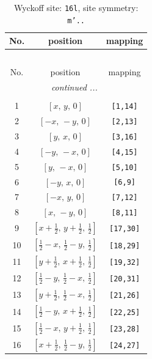 \documentclass[fleqn,8pt]{jsarticle}
\begin{document}
\renewcommand{\arraystretch}{1.2}
\begin{longtable}{ccc}
\caption{Wyckoff site: {\tt 16l}, site symmetry: {\tt m'..}}
 \\
 \hline \hline
No. & position & mapping \\ \hline \endfirsthead

\multicolumn{2}{l}{\tablename\ \thetable{}} \\
 \hline \hline
No. & position & mapping \\ \hline \endhead

 \hline \hline
\multicolumn{2}{r}{\footnotesize\it continued ...} \\ \endfoot

 \hline \hline
\multicolumn{2}{r}{} \\ \endlastfoot

1 & $\left[ x,\, y,\, 0 \right]$ & {\tt [1,14]} \\ \hline
2 & $\left[ - x,\, - y,\, 0 \right]$ & {\tt [2,13]} \\ \hline
3 & $\left[ y,\, x,\, 0 \right]$ & {\tt [3,16]} \\ \hline
4 & $\left[ - y,\, - x,\, 0 \right]$ & {\tt [4,15]} \\ \hline
5 & $\left[ y,\, - x,\, 0 \right]$ & {\tt [5,10]} \\ \hline
6 & $\left[ - y,\, x,\, 0 \right]$ & {\tt [6,9]} \\ \hline
7 & $\left[ - x,\, y,\, 0 \right]$ & {\tt [7,12]} \\ \hline
8 & $\left[ x,\, - y,\, 0 \right]$ & {\tt [8,11]} \\ \hline
9 & $\left[ x + \frac{1}{2},\, y + \frac{1}{2},\, \frac{1}{2} \right]$ & {\tt [17,30]} \\ \hline
10 & $\left[ \frac{1}{2} - x,\, \frac{1}{2} - y,\, \frac{1}{2} \right]$ & {\tt [18,29]} \\ \hline
11 & $\left[ y + \frac{1}{2},\, x + \frac{1}{2},\, \frac{1}{2} \right]$ & {\tt [19,32]} \\ \hline
12 & $\left[ \frac{1}{2} - y,\, \frac{1}{2} - x,\, \frac{1}{2} \right]$ & {\tt [20,31]} \\ \hline
13 & $\left[ y + \frac{1}{2},\, \frac{1}{2} - x,\, \frac{1}{2} \right]$ & {\tt [21,26]} \\ \hline
14 & $\left[ \frac{1}{2} - y,\, x + \frac{1}{2},\, \frac{1}{2} \right]$ & {\tt [22,25]} \\ \hline
15 & $\left[ \frac{1}{2} - x,\, y + \frac{1}{2},\, \frac{1}{2} \right]$ & {\tt [23,28]} \\ \hline
16 & $\left[ x + \frac{1}{2},\, \frac{1}{2} - y,\, \frac{1}{2} \right]$ & {\tt [24,27]} \\
\end{longtable}
\end{document}
